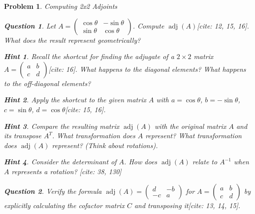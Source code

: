 \documentclass[12pt]{article}
\newtheorem{problem}{Problem}[section]
\newtheorem{question}{Question}[problem]
\theoremstyle{definition}
\newtheorem{hint}{Hint}[question]
\newcommand{\adj}{\operatorname{adj}}
\begin{document}
\begin{problem}{Computing 2x2 Adjoints}
    \begin{question}
        Let $A = \begin{pmatrix} \cos \theta & -\sin \theta \\ \sin \theta & \cos \theta \end{pmatrix}$. Compute $\adj(A)$[cite: 12, 15, 16]. What does the result represent geometrically?
    \end{question}
    
        \begin{hint}
            Recall the shortcut for finding the adjugate of a $2 \times 2$ matrix $A = \begin{pmatrix} a & b \\ c & d \end{pmatrix}$[cite: 16]. What happens to the diagonal elements? What happens to the off-diagonal elements?
        \end{hint}
        \begin{hint}
            Apply the shortcut to the given matrix $A$ with $a = \cos \theta$, $b = -\sin \theta$, $c = \sin \theta$, $d = \cos \theta$[cite: 15, 16].
        \end{hint}
        \begin{hint}
            Compare the resulting matrix $\adj(A)$ with the original matrix $A$ and its transpose $A^T$. What transformation does $A$ represent? What transformation does $\adj(A)$ represent? (Think about rotations).
        \end{hint}
         \begin{hint}
             Consider the determinant of $A$. How does $\adj(A)$ relate to $A^{-1}$ when $A$ represents a rotation? [cite: 38, 130]
         \end{hint}
    

    \begin{question}
        Verify the formula $\adj(A) = \begin{pmatrix} d & -b \\ -c & a \end{pmatrix}$ for $A = \begin{pmatrix} a & b \\ c & d \end{pmatrix}$ by explicitly calculating the cofactor matrix $C$ and transposing it[cite: 13, 14, 15].
    \end{question}
        

\end{problem}
\end{document}
